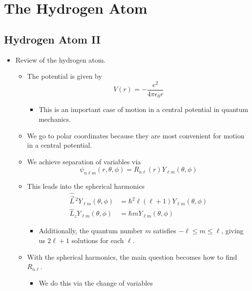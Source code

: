 \documentclass[../notes.tex]{subfiles}
\begin{document}
\chapter{The Hydrogen Atom}
\section{Hydrogen Atom II}
\begin{itemize}
    \item {}Review of the hydrogen atom.
    \begin{itemize}
        \item The potential is given by
        \begin{equation*}
            V(r) = -\frac{e^2}{4\pi\epsilon_0r}
        \end{equation*}
        \begin{itemize}
            \item This is an important case of motion in a central potential in quantum mechanics.
        \end{itemize}
        \item We go to polar coordinates because they are most convenient for motion in a central potential.
        \item We achieve separation of variables via
        \begin{equation*}
            \psi_{n\ell m}(r,\theta,\phi) = R_{n\ell}(r)Y_{\ell m}(\theta,\phi)
        \end{equation*}
        \item This leads into the spherical harmonics
        \begin{align*}
            \hat{\vec{L}}{\,}^2Y_{\ell m}(\theta,\phi) &= \hbar^2\ell(\ell+1)Y_{\ell m}(\theta,\phi)\\
            \hat{L}_zY_{\ell m}(\theta,\phi) &= \hbar mY_{\ell m}(\theta,\phi)
        \end{align*}
        \begin{itemize}
            \item Additionally, the quantum number $m$ satisfies $-\ell\leq m\leq\ell$, giving us $2\ell+1$ solutions for each $\ell$.
        \end{itemize}
        \item With the spherical harmonics, the main question becomes how to find $R_{n\ell}$.
        \begin{itemize}
            \item We do this via the change of variables

\end{itemize}
\end{itemize}
\end{itemize}
\end{document}
